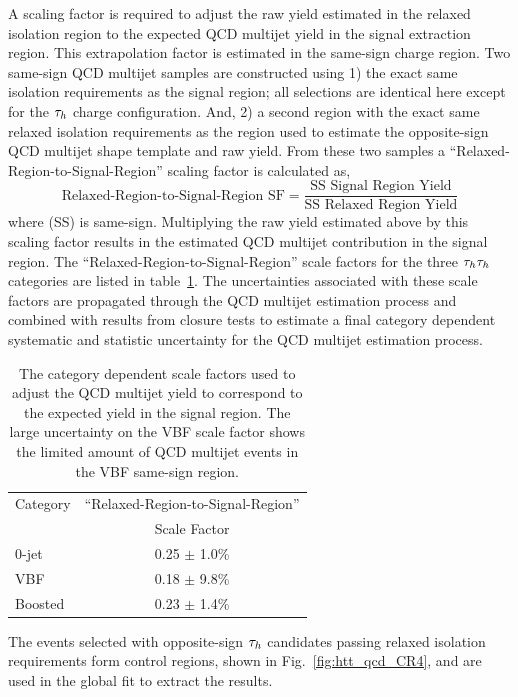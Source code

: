 A scaling factor is required to adjust the raw yield estimated in the relaxed isolation region to the expected
QCD multijet yield in the signal extraction region. This extrapolation factor
is estimated in the same-sign charge region. Two same-sign QCD multijet samples are constructed
using 1) the exact same isolation requirements as the signal region; all selections are identical
here except for the $\tau_{h}$ charge configuration. And, 2) a second region with the exact 
same relaxed isolation requirements as the region used to estimate the opposite-sign
QCD multijet shape template and raw yield. From these two samples a ``Relaxed-Region-to-Signal-Region''
scaling factor is calculated as,
\begin{equation}
\label{eqn:htt_tt_qcd_sf}
\text{Relaxed-Region-to-Signal-Region SF} = \frac{\text{SS Signal Region Yield}}{\text{SS Relaxed Region Yield}}
\end{equation}
where (SS) is same-sign.
Multiplying the raw yield estimated above by this scaling factor results in the estimated
QCD multijet contribution in the signal region. The ``Relaxed-Region-to-Signal-Region'' scale factors
for the three $\tau_{h}\tau_{h}$ categories are listed in table~\ref{tab:htt_qcd_sf}. The uncertainties associated
with these scale factors are propagated through the QCD multijet estimation process and combined
with results from closure tests to estimate a final category dependent systematic and statistic uncertainty
for the QCD multijet estimation process.

\begin{table}[htbp]
\centering
\begin{tabular}{|l|c|}
\hline
Category   &   ``Relaxed-Region-to-Signal-Region''   \\
           &   Scale Factor   \\
\hline
0-jet      &    0.25 $\pm$ 1.0\%  \\
VBF        &    0.18 $\pm$ 9.8\%  \\
Boosted    &    0.23 $\pm$ 1.4\%  \\  
\hline
\end{tabular}
\label{tab:htt_qcd_sf}
\caption{
The category dependent scale factors used to adjust the QCD multijet yield to correspond 
to the expected yield in the signal region. The large uncertainty on the VBF scale factor shows the
limited amount of QCD multijet events in the VBF same-sign region. 
}
\end{table}

The events selected with opposite-sign $\tau_{h}$ candidates passing relaxed isolation requirements 
form control regions, shown in Fig.~\ref{fig:htt_qcd_CR4}, and are used in the global fit to extract the results.

